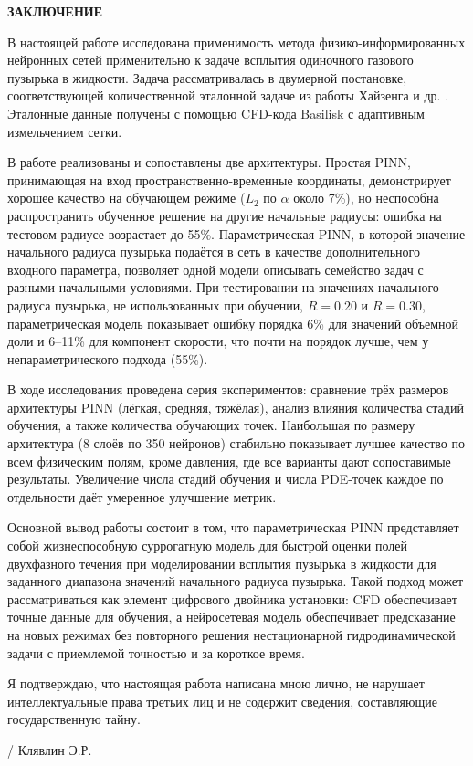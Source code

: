 \newpage
\begin{center}
  \textbf{\large ЗАКЛЮЧЕНИЕ}
\end{center}

В настоящей работе исследована применимость метода физико-информированных нейронных сетей
применительно к задаче всплытия одиночного газового пузырька в жидкости. Задача
рассматривалась в двумерной постановке, соответствующей количественной
эталонной задаче из работы Хайзенга и др. \cite{Hysing2009}. Эталонные данные получены
с помощью CFD-кода Basilisk с адаптивным измельчением сетки.

В работе реализованы и сопоставлены две архитектуры. Простая PINN, принимающая
на вход пространственно-временные координаты, демонстрирует хорошее качество
на обучающем режиме (\(L_2\) по \(\alpha\) около 7\%), но неспособна
распространить обученное решение на другие начальные радиусы: ошибка на
тестовом радиусе возрастает до 55\%. Параметрическая PINN, в которой значение начального
радиуса пузырька подаётся в сеть в качестве дополнительного входного параметра, позволяет
одной модели описывать семейство задач с разными начальными условиями. При
тестировании на значениях начального радиуса пузырька, не использованных при обучении, \(R=0.20\) и \(R=0.30\),
параметрическая модель показывает ошибку порядка 6\% для значений объемной доли и 6--11\%
для компонент скорости, что почти на порядок лучше, чем у непараметрического подхода (55\%).

В ходе исследования проведена серия экспериментов:
сравнение трёх размеров архитектуры PINN (лёгкая, средняя, тяжёлая), анализ влияния количества
стадий обучения, а также количества обучающих точек. Наибольшая по размеру
архитектура (8 слоёв по 350 нейронов) стабильно показывает лучшее качество по
всем физическим полям, кроме давления, где все варианты дают сопоставимые
результаты. Увеличение числа стадий обучения и числа PDE-точек каждое по
отдельности даёт умеренное улучшение метрик.

Основной вывод работы состоит в том, что параметрическая PINN представляет
собой жизнеспособную суррогатную модель для быстрой оценки полей двухфазного течения при моделировании всплытия
пузырька в жидкости для заданного диапазона значений начального радиуса пузырька. Такой подход
может рассматриваться как элемент цифрового двойника установки: CFD обеспечивает
точные данные для обучения, а нейросетевая модель обеспечивает предсказание
на новых режимах без повторного решения нестационарной гидродинамической задачи с приемлемой точностью и за короткое время.

\vspace{2em}
Я подтверждаю, что настоящая работа написана мною лично, не нарушает интеллектуальные права третьих лиц и не содержит сведения, составляющие государственную тайну.

\vspace{2em}
\noindent\hfill\underline{\hspace{3cm}} / Клявлин Э.Р.

